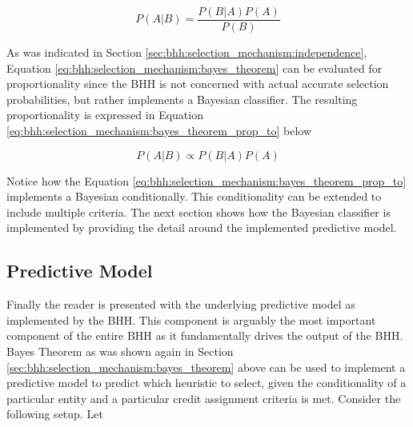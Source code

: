 \begin{equation}
    \label{eq:bhh:selection_mechanism:bayes_theorem}
    P(A \vert B) = \frac{P(B \vert A)P(A)}{P(B)}
\end{equation}

As was indicated in Section \ref{sec:bhh:selection_mechanism:independence}, Equation \ref{eq:bhh:selection_mechanism:bayes_theorem} can be evaluated for proportionality since the \ac{BHH} is not concerned with actual accurate selection probabilities, but rather implements a Bayesian classifier. The resulting proportionality is expressed in Equation \ref{eq:bhh:selection_mechanism:bayes_theorem_prop_to} below

\begin{equation}
    \label{eq:bhh:selection_mechanism:bayes_theorem_prop_to}
    P(A \vert B) \propto P(B \vert A)P(A)
\end{equation}

Notice how the Equation \ref{eq:bhh:selection_mechanism:bayes_theorem_prop_to} implements a Bayesian conditionally. This conditionality can be extended to include multiple criteria. The next section shows how the Bayesian classifier is implemented by providing the detail around the implemented predictive model.


\subsection{Predictive Model}
\label{sec:bhh:selection_mechanism:predictive_model}

Finally the reader is presented with the underlying predictive model as implemented by the \ac{BHH}. This component is arguably the most important component of the entire \ac{BHH} as it fundamentally drives the output of the \ac{BHH}. Bayes Theorem as was shown again in Section \ref{sec:bhh:selection_mechanism:bayes_theorem} above can be used to implement a predictive model to predict which heuristic to select, given the conditionality of a particular entity and a particular credit assignment criteria is met. Consider the following setup. Let


